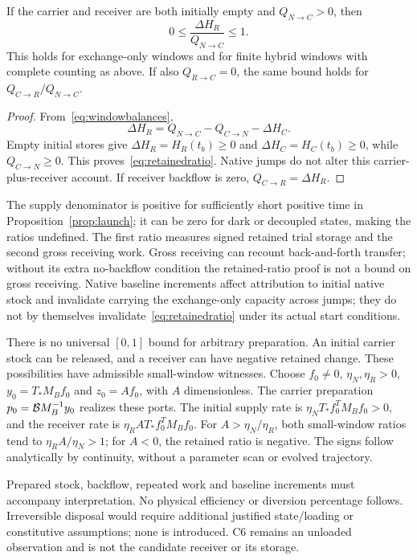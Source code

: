 \begin{proposition}\label{prop:ratio}
If the carrier and receiver are both initially empty and $Q_{N\to C}>0$, then
\begin{equation}\label{eq:retainedratio}
 0\le\frac{\Delta H_R}{Q_{N\to C}}\le1.
\end{equation}
This holds for exchange-only windows and for finite hybrid windows with complete counting as above. If also $Q_{R\to C}=0$, the same bound holds for $Q_{C\to R}/Q_{N\to C}$.
\end{proposition}
\begin{proof}
From~\eqref{eq:windowbalances},
\begin{equation}\label{eq:ratioidentity}
 \Delta H_R=Q_{N\to C}-Q_{C\to N}-\Delta H_C.
\end{equation}
Empty initial stores give $\Delta H_R=H_R(t_b)\ge0$ and $\Delta H_C=H_C(t_b)\ge0$, while $Q_{C\to N}\ge0$. This proves~\eqref{eq:retainedratio}. Native jumps do not alter this carrier-plus-receiver account. If receiver backflow is zero, $Q_{C\to R}=\Delta H_R$.
\end{proof}
The supply denominator is positive for sufficiently short positive time in Proposition~\ref{prop:launch}; it can be zero for dark or decoupled states, making the ratios undefined. The first ratio measures signed retained trial storage and the second gross receiving work. Gross receiving can recount back-and-forth transfer; without its extra no-backflow condition the retained-ratio proof is not a bound on gross receiving. Native baseline increments affect attribution to initial native stock and invalidate carrying the exchange-only capacity across jumps; they do not by themselves invalidate~\eqref{eq:retainedratio} under its actual start conditions.

There is no universal $[0,1]$ bound for arbitrary preparation. An initial carrier stock can be released, and a receiver can have negative retained change. These possibilities have admissible small-window witnesses. Choose $f_0\ne0$, $\eta_N,\eta_R>0$, $y_0=T_*M_Bf_0$ and $z_0=A f_0$, with $A$ dimensionless. The carrier preparation $p_0=\mathcal B M_B^{-1}y_0$ realizes these ports. The initial supply rate is $\eta_NT_*f_0^TM_Bf_0>0$, and the receiver rate is $\eta_RA T_*f_0^TM_Bf_0$. For $A>\eta_N/\eta_R$, both small-window ratios tend to $\eta_RA/\eta_N>1$; for $A<0$, the retained ratio is negative. The signs follow analytically by continuity, without a parameter scan or evolved trajectory.

Prepared stock, backflow, repeated work and baseline increments must accompany interpretation. No physical efficiency or diversion percentage follows. Irreversible disposal would require additional justified state/loading or constitutive assumptions; none is introduced. C6 remains an unloaded observation and is not the candidate receiver or its storage.~\cite[exterior equation and limitations]{paired}
